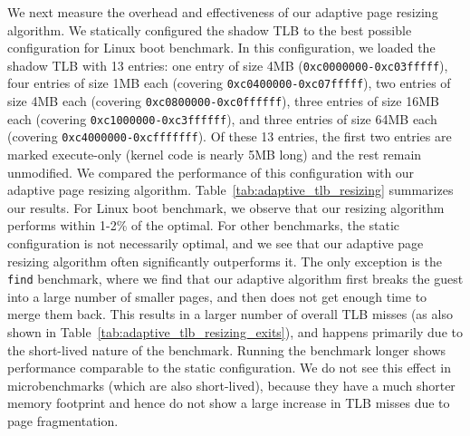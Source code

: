 \documentclass[10pt,twocolumn]{article}
\begin{document}
We next measure the overhead and effectiveness
of our adaptive page resizing algorithm. We statically configured the
shadow TLB to the best possible configuration for Linux boot benchmark.
In this configuration, we loaded the shadow TLB with 13 entries:
one entry of size 4MB ({\tt 0xc0000000-0xc03fffff}), four entries
of size 1MB each (covering {\tt 0xc0400000-0xc07fffff}), two entries
of size 4MB each (covering {\tt 0xc0800000-0xc0ffffff}),
three entries of size 16MB each (covering {\tt 0xc1000000-0xc3ffffff}),
and three entries of size 64MB each (covering {\tt 0xc4000000-0xcfffffff}).
Of these 13 entries, the first two entries are marked
execute-only (kernel code is nearly 5MB long) and the
rest remain unmodified.
We compared the performance of this configuration with our adaptive page
resizing algorithm.
Table~\ref{tab:adaptive_tlb_resizing} summarizes our results.
For Linux boot benchmark, we observe that our resizing algorithm performs
within 1-2\% of the optimal. For other benchmarks, the static configuration
is not necessarily optimal, and we see that our
adaptive page resizing algorithm often significantly outperforms it.
The only exception is the {\tt find} benchmark, where we find that
our adaptive algorithm first breaks the guest into a large number
of smaller pages, and then does not get enough time to merge them back. This
results in a larger number of overall TLB misses (as also shown in
Table~\ref{tab:adaptive_tlb_resizing_exits}), and happens primarily due
to the short-lived nature of the benchmark. Running the benchmark longer shows
performance comparable to the static configuration. We do not
see this effect in microbenchmarks (which are
also short-lived), because they have a much shorter memory footprint
and hence do not show a large increase in TLB misses due to
page fragmentation.
\end{document}
